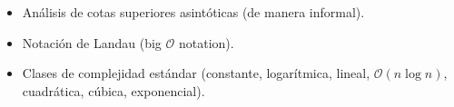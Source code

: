 \begin{itemize}
	\item[\advanced] Análisis de cotas superiores asintóticas (de
    manera informal).
	\item[\advanced] Notación de Landau (big $\mathcal{O}$ notation).
	\item[\advanced] Clases de complejidad estándar (constante, logarítmica, lineal, $\mathcal{O}(n \log{}n)$, cuadrática, cúbica, exponencial).
\end{itemize}


